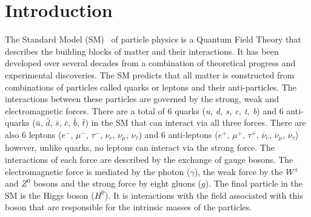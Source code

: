 \chapter{{\bf Introduction}}
\label{sec:intro}


The Standard Model (SM)~\cite{GLASHOW1961579,PhysRevLett.19.1264,PhysRevD.2.1285} of particle physics is a Quantum Field Theory that describes the building blocks of matter and their interactions. It has been developed over several decades from a combination of theoretical progress and experimental discoveries. 
The SM predicts that all matter is constructed from combinations of particles called quarks or leptons and their anti-particles. The interactions between these particles are governed by the strong, weak and electromagnetic forces. 
There are a total of 6 quarks ({\it u, d, s, c, t, b}) and 6 anti-quarks ($\bar{u}$, $\bar{d}$, $\bar{s}$, $\bar{c}$, $\bar{b}$, $\bar{t}$) in the SM that can interact via all three forces. There are also 6 leptons ($e^{-}$, $\mu^{-}$, $\tau^{-}$, $\nu_e$, $\nu_{\mu}$, $\nu_{\tau}$) and 6 anti-leptons ($e^{+}$, $\mu^{+}$, $\tau^{+}$, $\overline{\nu}_e$, $\overline{\nu}_{\mu}$, $\overline{\nu}_{\tau}$) however, unlike quarks, no leptons can interact via the strong force.
The interactions of each force are described by the exchange of gauge bosons. The electromagnetic force is mediated by the photon ($\gamma$), the weak force by the $W^{\pm}$ and $Z^0$ bosons and the strong force by eight gluons ($g$). 
The final particle in the SM is the Higgs boson ($H^0$). It is interactions with the field associated with this boson that are responsible for the intrinsic masses of the particles.  




